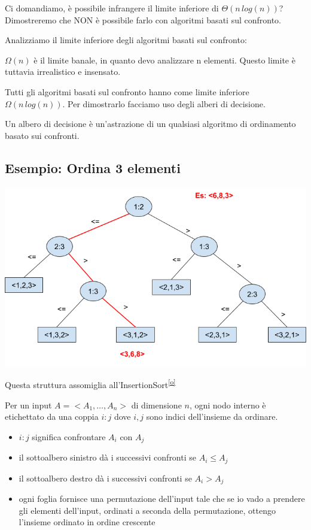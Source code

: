 \documentclass[tikz]{article}
\providecommand{\tightlist}{%
  \setlength{\itemsep}{0pt}\setlength{\parskip}{0pt}}
\begin{document}
{Ci domandiamo, è possibile infrangere il limite inferiore di $\Theta(n\,log(n))$? Dimostreremo che NON è possibile farlo con algoritmi basati sul confronto.}

{Analizziamo il limite inferiore degli algoritmi basati sul confronto:}

{$\Omega(n)$ è il limite banale, in quanto devo analizzare n elementi. Questo limite è tuttavia irrealistico e insensato.}

{Tutti gli algoritmi basati sul confronto hanno come limite inferiore $\Omega(n\,log(n))$. Per dimostrarlo facciamo uso degli alberi di decisione.}

{Un albero di decisione è un'astrazione di un qualsiasi algoritmo di ordinamento basato sui confronti.}

\subsection{Esempio: Ordina 3 elementi}

{\includegraphics{images/image531.png}}

{Questa struttura assomiglia all'InsertionSort}\textsuperscript{\protect\hyperlink{cmnt15}{{[}o{]}}}

{Per un input $A = <A_1,\ldots,A_n>$ di dimensione $n$, ogni nodo interno è etichettato da una coppia $i:j$ dove $i,j$ sono indici dell'insieme da ordinare.}

\begin{itemize}
\tightlist
\item
  {$i:j$ significa confrontare $A_i$ con $A_j$}
\item
  {il sottoalbero sinistro dà i successivi confronti se $A_i \leq A_j$}
\item
  {il sottoalbero destro dà i successivi confronti se $A_i > A_j$}
\item
  {ogni foglia fornisce una permutazione dell'input tale che se io vado a prendere gli elementi dell'input, ordinati a seconda della permutazione, ottengo l'insieme ordinato in ordine crescente}
\end{itemize}
\end{document}
